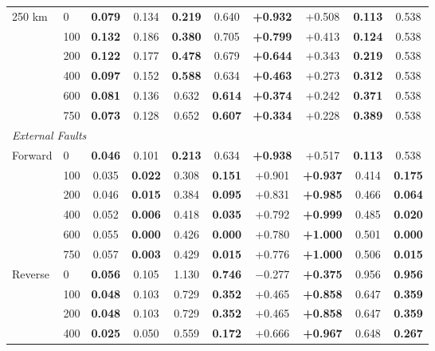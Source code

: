 \documentclass[journal]{IEEEtran}
\begin{document}
\begin{table}[!t]
\begin{tabular}{@{}llcccccccc@{}}
250 km & 0   & \textbf{0.079} & 0.134 & \textbf{0.219} & 0.640 & \textbf{+0.932} & +0.508 & \textbf{0.113} & 0.538 \\
       & 100 & \textbf{0.132} & 0.186 & \textbf{0.380} & 0.705 & \textbf{+0.799} & +0.413 & \textbf{0.124} & 0.538 \\
       & 200 & \textbf{0.122} & 0.177 & \textbf{0.478} & 0.679 & \textbf{+0.644} & +0.343 & \textbf{0.219} & 0.538 \\
       & 400 & \textbf{0.097} & 0.152 & \textbf{0.588} & 0.634 & \textbf{+0.463} & +0.273 & \textbf{0.312} & 0.538 \\
       & 600 & \textbf{0.081} & 0.136 & 0.632 & \textbf{0.614} & \textbf{+0.374} & +0.242 & \textbf{0.371} & 0.538 \\
       & 750 & \textbf{0.073} & 0.128 & 0.652 & \textbf{0.607} & \textbf{+0.334} & +0.228 & \textbf{0.389} & 0.538 \\
\midrule
\multicolumn{10}{l}{\textit{External Faults}} \\
\midrule
Forward & 0   & \textbf{0.046} & 0.101 & \textbf{0.213} & 0.634 & \textbf{+0.938} & +0.517 & \textbf{0.113} & 0.538 \\
        & 100 & 0.035 & \textbf{0.022} & 0.308 & \textbf{0.151} & +0.901 & \textbf{+0.937} & 0.414 & \textbf{0.175} \\
        & 200 & 0.046 & \textbf{0.015} & 0.384 & \textbf{0.095} & +0.831 & \textbf{+0.985} & 0.466 & \textbf{0.064} \\
        & 400 & 0.052 & \textbf{0.006} & 0.418 & \textbf{0.035} & +0.792 & \textbf{+0.999} & 0.485 & \textbf{0.020} \\
        & 600 & 0.055 & \textbf{0.000} & 0.426 & \textbf{0.000} & +0.780 & \textbf{+1.000} & 0.501 & \textbf{0.000} \\
        & 750 & 0.057 & \textbf{0.003} & 0.429 & \textbf{0.015} & +0.776 & \textbf{+1.000} & 0.506 & \textbf{0.015} \\
\cmidrule{1-10}
Reverse & 0   & \textbf{0.056} & 0.105 & 1.130 & \textbf{0.746} & $-$0.277 & \textbf{+0.375} & 0.956 & \textbf{0.956} \\
        & 100 & \textbf{0.048} & 0.103 & 0.729 & \textbf{0.352} & +0.465 & \textbf{+0.858} & 0.647 & \textbf{0.359} \\
        & 200 & \textbf{0.048} & 0.103 & 0.729 & \textbf{0.352} & +0.465 & \textbf{+0.858} & 0.647 & \textbf{0.359} \\
        & 400 & \textbf{0.025} & 0.050 & 0.559 & \textbf{0.172} & +0.666 & \textbf{+0.967} & 0.648 & \textbf{0.267} \\

\end{tabular}
\end{table}
\end{document}
